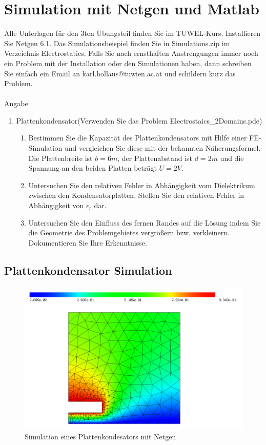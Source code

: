 \section{Simulation mit Netgen und Matlab}

Alle Unterlagen für den 3ten Übungsteil finden Sie im TUWEL-Kurs. Installieren Sie Netgen 6.1. Das Simulationsbeispiel finden Sie in Simulations.zip im Verzeichnis Electrostatics.
Falls Sie nach ernsthaften Anstrengungen immer noch ein Problem mit der Installation oder den Simulationen haben, dann schreiben Sie einfach ein Email an karl.hollaus@tuwien.ac.at und schildern kurz das Problem.
\\
\\

{\large Angabe}
\begin{enumerate}
	\item Plattenkondensator(Verwenden Sie das Problem Electrostaics\_2Domains.pde)
	\begin{enumerate}
		

	\item Bestimmen Sie die Kapazität des Plattenkondensators mit Hilfe einer FE-Simulation und vergleichen Sie diese mit der bekannten Näherungsformel. Die Plattenbreite ist $b = 6m$, der Plattenabstand ist $d = 2m$ und die Spannung an den beiden Platten beträgt $U=2V$.
	\item Untersuchen Sie den relativen Fehler in Abhängigkeit vom Dielektrikum zwischen den Kondensatorplatten. Stellen Sie den relativen Fehler in Abhängigkeit von $\epsilon_r$ dar.
	\item Untersuchen Sie den Einfluss des fernen Randes auf die Lösung indem Sie die Geometrie des Problemgebietes vergrößern bzw. verkleinern. Dokumentieren Sie Ihre Erkenntnisse.
		\end{enumerate}
\end{enumerate}

\subsection{Plattenkondensator Simulation}
\begin{figure}[h]
	\centering
	\includegraphics[width=0.7\linewidth]{../Netgen/pde1}
	\caption{Simulation eines Plattenkondesators mit Netgen}
	\label{fig:pde1}
\end{figure}

